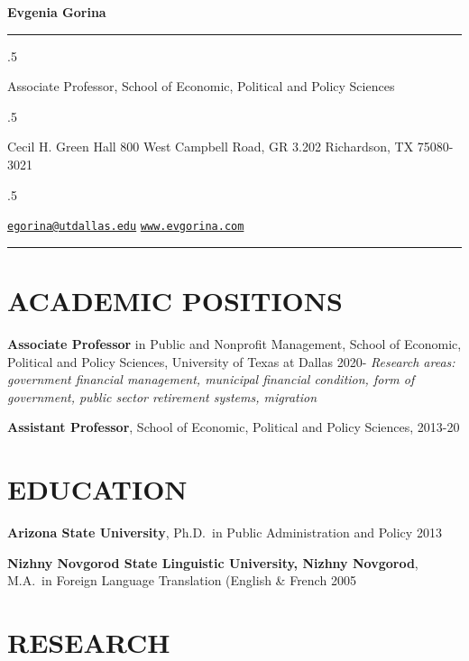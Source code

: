 \documentclass[11pt,]{article}
\begin{document}
\centerline{\huge \bf Evgenia Gorina}

\vspace{2 mm}

\hrule

\vspace{2 mm}

\moveleft.5\hoffset\centerline{Associate Professor, School of Economic,
Political and Policy Sciences}
\moveleft.5\hoffset\centerline{Cecil H. Green Hall \textbar{} 800 West
Campbell Road, GR 3.202 \textbar{} Richardson, TX 75080-3021}
\moveleft.5\hoffset\centerline{ \faEnvelopeO \hspace{1 mm} \href{mailto:}{\tt \href{mailto:egorina@utdallas.edu}{\nolinkurl{egorina@utdallas.edu}}} \hspace{1 mm}     \faGlobe \hspace{1 mm} \href{http://www.evgorina.com}{\tt www.evgorina.com}   }

\vspace{2 mm}

\hrule


\hypertarget{academic-positions}{%
\section{ACADEMIC POSITIONS}\label{academic-positions}}

\textbf{Associate Professor} in Public and Nonprofit Management, School
of Economic, Political and Policy Sciences, University of Texas at
Dallas \hfill 2020- \emph{Research areas: government financial
management, municipal financial condition, form of government, public
sector retirement systems, migration}

\textbf{Assistant Professor}, School of Economic, Political and Policy
Sciences, \hfill 2013-20

\hypertarget{education}{%
\section{EDUCATION}\label{education}}

\textbf{Arizona State University}, Ph.D.~in Public Administration and
Policy \hfill 2013

\textbf{Nizhny Novgorod State Linguistic University, Nizhny Novgorod},
M.A.~in Foreign Language Translation (English \& French \hfill 2005

\hypertarget{research}{%
\section{RESEARCH}\label{research}}
\end{document}
